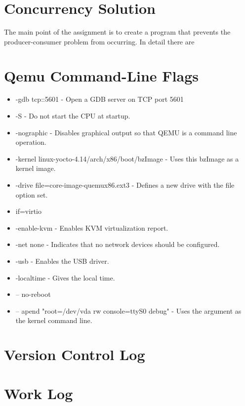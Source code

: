 \documentclass[draftclsnofoot,onecolumn,10pt,compsoc]{IEEEtran}
\begin{document}
\section{Concurrency Solution}
The main point of the assignment is to create a program that prevents the
producer-consumer problem from occurring. In detail there are 
\section{Qemu Command-Line Flags}
\begin{itemize}
	\item -gdb tcp::5601 - Open a GDB server on TCP port 5601
	\item -S - Do not start the CPU at startup.
	\item -nographic - Disables graphical output so that QEMU is a command line operation.
	\item -kernel linux-yocto-4.14/arch/x86/boot/bzImage - Uses this bzImage as a kernel image.
	\item -drive file=core-image-quemux86.ext3 - Defines a new drive with the file option set.
	\item if=virtio
	\item -enable-kvm - Enables KVM virtualization report.
	\item -net none - Indicates that no network devices should be configured.
	\item -usb - Enables the USB driver.
	\item -localtime - Gives the local time.
	\item -- no-reboot
	\item -- apend "root=/dev/vda rw console=ttyS0 debug" - Uses the argument as the kernel command line.
\end{itemize}
\section{Version Control Log}
\section{Work Log}
\end{document}
